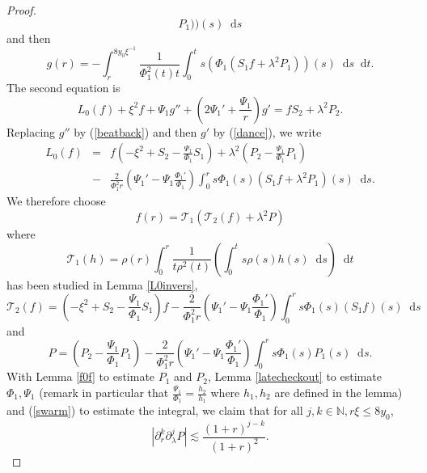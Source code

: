 \documentclass[11 pt]{amsart}
\theoremstyle{definition}
\theoremstyle{remark}
\numberwithin{equation}{section}
\newcommand{\dd}{\mathop{}\!\mathrm{d}}
\begin{document}
\begin{proof}
\begin{equation}
    P_1)) (s) \dd s\label{dance}
  \end{equation}
  and then
  \[ g (r) = - \int_r^{8 y_0 \xi^{- 1}} \frac{1}{\Phi_1^2 (t) t} \int_0^t s
     (\Phi_1 (S_1 f + \lambda^2 P_1)) (s) \dd s \dd t. \]
  The second equation is
  \[ L_0 (f) +\xi^2 f + \Psi_1 g'' + \left( 2 \Psi_1' + \frac{\Psi_1}{r} \right) g' = f
     S_2 + \lambda^2 P_2 . \]
  Replacing $g''$ by (\ref{beatback}) and then $g'$ by (\ref{dance}), we write
  \begin{eqnarray*}
    L_0 (f) & = & f \left( -\xi^2+S_2 - \frac{\Psi_1}{\Phi_1} S_1 \right) + \lambda^2
    \left( P_2 - \frac{\Psi_1}{\Phi_1} P_1 \right)\\
    & - & \frac{2}{\Phi_1^2 r} \left( \Psi_1' - \Psi_1 \frac{\Phi_1'}{\Phi_1}
    \right) \int_0^r s \Phi_1 (s) (S_1 f + \lambda^2 P_1) (s)\dd s.
  \end{eqnarray*}
  We therefore choose
  \[ f (r) =\mathcal{T}_1 (\mathcal{T}_2 (f) + \lambda^2 P) \]
  where
  \[ \mathcal{T}_1 (h) = \rho (r) \int_0^r \frac{1}{t \rho^2 (t)} \left(
     \int_0^t s \rho (s) h (s) \dd s\right)\dd t \]
  has been studied in Lemma \ref{L0invers},
  \[ \mathcal{T}_2 (f) = \left(-\xi^2+ S_2 - \frac{\Psi_1}{\Phi_1} S_1 \right)
     f - \frac{2}{\Phi_1^2 r} \left( \Psi_1' - \Psi_1 \frac{\Phi_1'}{\Phi_1}
     \right) \int_0^r s \Phi_1 (s) (S_1 f) (s) \dd s\]
  and
  \[ P = \left( P_2 - \frac{\Psi_1}{\Phi_1} P_1 \right) -
     \frac{2}{\Phi_1^2 r} \left( \Psi_1' - \Psi_1 \frac{\Phi_1'}{\Phi_1}
     \right) \int_0^r s \Phi_1 (s) P_1 (s)\dd s. \]
  With Lemma \ref{f0f} to estimate $P_1$ and $P_2$, Lemma \ref{latecheckout}
  to estimate $\Phi_1, \Psi_1$ (remark in particular that
  $\frac{\Psi_1}{\Phi_1} = \frac{h_2}{h_1}$ where $h_1, h_2$ are defined in
  the lemma) and (\ref{swarm}) to estimate the integral, we claim that for all
  $j, k \in \mathbb{N}, r \xi \leqslant 8 y_0$,
  \begin{equation}
    | \partial_r^k \partial_{\lambda}^j P | \lesssim \frac{(1 + r)^{j - k}}{(1
    + r)^2} . \label{nowbreath2}
  \end{equation}


\end{proof}
\end{document}
